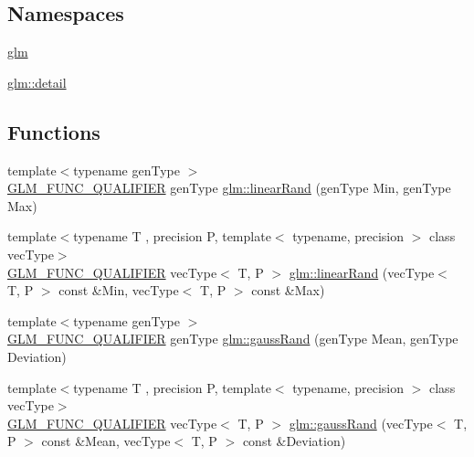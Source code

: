 \subsection*{Namespaces}
\begin{DoxyCompactItemize}
\item 
 \mbox{\hyperlink{namespaceglm}{glm}}
\item 
 \mbox{\hyperlink{namespaceglm_1_1detail}{glm\+::detail}}
\end{DoxyCompactItemize}
\subsection*{Functions}
\begin{DoxyCompactItemize}
\item 
{\footnotesize template$<$typename gen\+Type $>$ }\\\mbox{\hyperlink{setup_8hpp_a33fdea6f91c5f834105f7415e2a64407}{G\+L\+M\+\_\+\+F\+U\+N\+C\+\_\+\+Q\+U\+A\+L\+I\+F\+I\+ER}} gen\+Type \mbox{\hyperlink{namespaceglm_ad60fbcaa8da896b6f2cdd0aa302b96a4}{glm\+::linear\+Rand}} (gen\+Type Min, gen\+Type Max)
\item 
{\footnotesize template$<$typename T , precision P, template$<$ typename, precision $>$ class vec\+Type$>$ }\\\mbox{\hyperlink{setup_8hpp_a33fdea6f91c5f834105f7415e2a64407}{G\+L\+M\+\_\+\+F\+U\+N\+C\+\_\+\+Q\+U\+A\+L\+I\+F\+I\+ER}} vec\+Type$<$ T, P $>$ \mbox{\hyperlink{group__gtc__random_gaba9cec867916d894d794a32897b7fdfd}{glm\+::linear\+Rand}} (vec\+Type$<$ T, P $>$ const \&Min, vec\+Type$<$ T, P $>$ const \&Max)
\item 
{\footnotesize template$<$typename gen\+Type $>$ }\\\mbox{\hyperlink{setup_8hpp_a33fdea6f91c5f834105f7415e2a64407}{G\+L\+M\+\_\+\+F\+U\+N\+C\+\_\+\+Q\+U\+A\+L\+I\+F\+I\+ER}} gen\+Type \mbox{\hyperlink{group__gtc__random_ga5193a83e49e4fdc5652c084711083574}{glm\+::gauss\+Rand}} (gen\+Type Mean, gen\+Type Deviation)
\item 
{\footnotesize template$<$typename T , precision P, template$<$ typename, precision $>$ class vec\+Type$>$ }\\\mbox{\hyperlink{setup_8hpp_a33fdea6f91c5f834105f7415e2a64407}{G\+L\+M\+\_\+\+F\+U\+N\+C\+\_\+\+Q\+U\+A\+L\+I\+F\+I\+ER}} vec\+Type$<$ T, P $>$ \mbox{\hyperlink{namespaceglm_adc010d4dd74cff264ee912f72de1adb9}{glm\+::gauss\+Rand}} (vec\+Type$<$ T, P $>$ const \&Mean, vec\+Type$<$ T, P $>$ const \&Deviation)
\item 

\end{DoxyCompactItemize}
